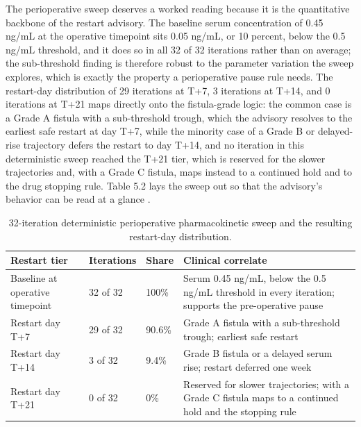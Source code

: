 The perioperative sweep deserves a worked reading because it is the quantitative
backbone of the restart advisory. The baseline serum concentration of 0.45 ng/mL at
the operative timepoint sits 0.05 ng/mL, or 10 percent, below the 0.5 ng/mL
threshold, and it does so in all 32 of 32 iterations rather than on average; the
sub-threshold finding is therefore robust to the parameter variation the sweep
explores, which is exactly the property a perioperative pause rule needs. The
restart-day distribution of 29 iterations at T+7, 3 iterations at T+14, and 0
iterations at T+21 maps directly onto the fistula-grade logic: the common case is a
Grade A fistula with a sub-threshold trough, which the advisory resolves to the
earliest safe restart at day T+7, while the minority case of a Grade B or
delayed-rise trajectory defers the restart to day T+14, and no iteration in this
deterministic sweep reached the T+21 tier, which is reserved for the slower
trajectories and, with a Grade C fistula, maps instead to a continued hold and to
the drug stopping rule. Table 5.2 lays the sweep out so that the advisory's behavior
can be read at a glance \cite{qspmetpancre,fdadigtwinpc,pdacdigtwinp}.

\begin{table}[t]
\caption{32-iteration deterministic perioperative pharmacokinetic sweep and the resulting restart-day distribution.}
\label{tab:sec04-sweep}
\centering
\begin{tabularx}{\textwidth}{L{4.6cm} C{2.4cm} C{2.0cm} Y}
\toprule
\textbf{Restart tier} & \textbf{Iterations} & \textbf{Share} & \textbf{Clinical correlate} \\
\midrule
Baseline at operative timepoint & 32 of 32 & 100\% & Serum 0.45 ng/mL, below the 0.5 ng/mL threshold in every iteration; supports the pre-operative pause \\
Restart day T+7 & 29 of 32 & 90.6\% & Grade A fistula with a sub-threshold trough; earliest safe restart \\
Restart day T+14 & 3 of 32 & 9.4\% & Grade B fistula or a delayed serum rise; restart deferred one week \\
Restart day T+21 & 0 of 32 & 0\% & Reserved for slower trajectories; with a Grade C fistula maps to a continued hold and the stopping rule \\
\bottomrule
\end{tabularx}
\end{table}

